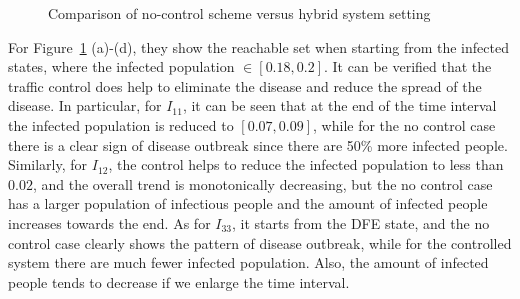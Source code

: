 \documentclass[review]{elsarticle}
\theoremstyle{plain}
\theoremstyle{definition}
\theoremstyle{remark}
\numberwithin{equation}{section}
\theoremstyle{remark}
\begin{document}
\begin{figure}[H]
	\caption{Comparison of no-control scheme versus hybrid system setting}
	\label{fig:compare}
\end{figure}

For Figure~\ref{fig:compare} (a)-(d), they show the reachable set when starting from the infected states, where the infected population $\in[0.18,0.2]$. It can be verified that the traffic control does help to eliminate the disease and reduce the spread of the disease. In particular, for $I_{11}$, it can be seen that at the end of the time interval the infected population is reduced to $[0.07,0.09]$, while for the no control case there is a clear sign of disease outbreak since there are 50\% more infected people. Similarly, for $I_{12}$, the control helps to reduce the infected population to less than $0.02$, and the overall trend is monotonically decreasing, but the no control case has a larger population of infectious people and the amount of infected people increases towards the end. As for $I_{33}$, it starts from the DFE state, and the no control case clearly shows the pattern of disease outbreak, while for the controlled system there are much fewer infected population. Also, the amount of infected people tends to decrease if we enlarge the time interval. 

 


%
\end{document}
